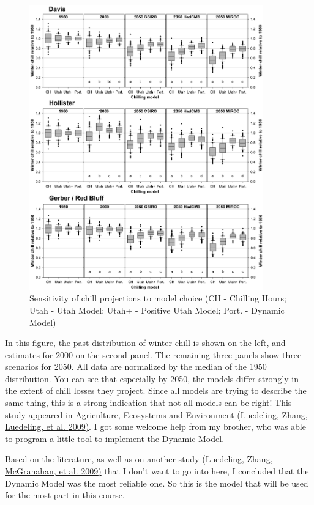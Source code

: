 \documentclass[
]{book}
\begin{document}
\begin{figure}
\centering
\includegraphics[width=0.9\textwidth,height=\textheight]{pictures/Luedeling_Figure_2.JPG}
\caption{Sensitivity of chill projections to model choice (CH - Chilling Hours; Utah - Utah Model; Utah+ - Positive Utah Model; Port. - Dynamic Model)}
\end{figure}

In this figure, the past distribution of winter chill is shown on the left, and estimates for 2000 on the second panel. The remaining three panels show three scenarios for 2050. All data are normalized by the median of the 1950 distribution. You can see that especially by 2050, the models differ strongly in the extent of chill losses they project. Since all models are trying to describe the same thing, this is a strong indication that not all models can be right! This study appeared in Agriculture, Ecosystems and Environment \href{https://www.sciencedirect.com/science/article/abs/pii/S0167880909001248}{(Luedeling, Zhang, Luedeling, et al. \protect\hyperlink{ref-luedeling_sensitivity_2009}{2009})}. I got some welcome help from my brother, who was able to program a little tool to implement the Dynamic Model.

Based on the literature, as well as on another study \href{https://www.sciencedirect.com/science/article/pii/S0168192309001580}{(Luedeling, Zhang, McGranahan, et al. \protect\hyperlink{ref-luedeling2009validation}{2009})} that I don't want to go into here, I concluded that the Dynamic Model was the most reliable one. So this is the model that will be used for the most part in this course.
\end{document}
